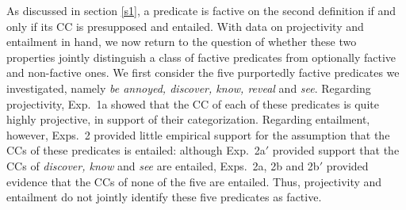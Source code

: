 \documentclass[11pt,fleqn]{article}
\newcommand{\6}{\mbox{$[\hspace*{-.6mm}[$}}
\newcommand{\9}{\mbox{$]\hspace*{-.6mm}]$}}
\begin{document}
{As discussed in section \ref{s1}, a predicate is factive on the second definition if and only if its CC is presupposed and entailed. With data on projectivity and entailment in hand, we now return to the question of whether these two properties jointly distinguish a class of factive predicates from optionally factive and non-factive ones. We first consider the five purportedly factive predicates we investigated, namely {\em be annoyed, discover, know, reveal} and {\em see}. Regarding projectivity, Exp.~1a showed that the CC of each of these predicates is quite highly projective, in support of their categorization. Regarding entailment, however, Exps.~2 provided little empirical support for the assumption that the CCs of these predicates is entailed: although Exp.~2a$'$ provided support that the CCs of {\em discover, know} and {\em see} are entailed, Exps.~2a, 2b and 2b$'$ provided evidence that the CCs of none of the five are entailed. Thus, projectivity and entailment do not jointly identify these five predicates as factive.

}
\end{document}
